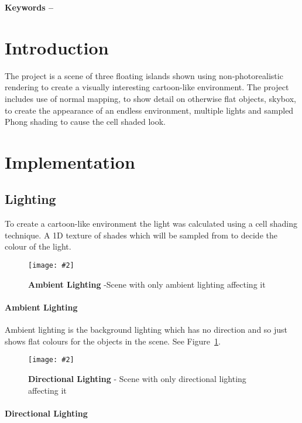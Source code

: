 \documentclass[10pt, a4paper]{article}
\title{\mytitle}
\author{\myauthor\hspace{1em}\\\contact\\Edinburgh Napier University\hspace{0.5em}-\hspace{0.5em}\mymodule}
\date{}
\newcommand{\figuremacro}[5]{
    \begin{figure}[#1]
        \centering
        \texttt{[image: \#2]}
        \caption[#3]{\textbf{#3}#4}
        \label{fig:#2}
    \end{figure}
}
\begin{document}
	\maketitle
	\begin{abstract}
		This project aims to render a 3D environment in real-time,
		using OpenGL and C++. The intent is to create a 3D
		scene shaded as if it where a cartoon
	\end{abstract}
    
	\textbf{Keywords -- }{\mykeywords}
	\section{Introduction}
    The project is a scene of three floating islands shown using non-photorealistic rendering to create a visually interesting cartoon-like environment. The project includes use of normal mapping, to show detail on otherwise flat objects, skybox, to create the appearance of an endless environment, multiple lights and sampled Phong shading to cause the cell shaded look. 
    
    \section{Implementation}
    \subsection{Lighting}
    To create a cartoon-like environment the light was calculated using a cell shading technique. A 1D texture of shades which will be sampled from to decide the colour of the light.
	
	\figuremacro{h}{Ambient}{Ambient Lighting}{ -Scene with only ambient lighting affecting it}{1.0}
	
	\paragraph{Ambient Lighting}
	
	Ambient lighting is the background lighting which has no direction and so just shows flat colours for the objects in the scene. See Figure~\ref{fig:Ambient}.
	
	\figuremacro{h}{Directional}{Directional Lighting}{ - Scene with only directional lighting affecting it}{1.0}
	
	\paragraph{Directional Lighting}
	 
\end{document}
